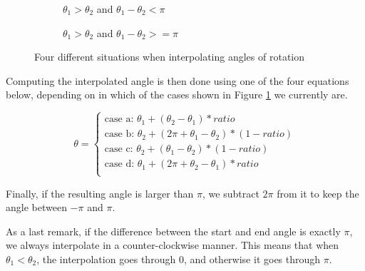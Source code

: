 \begin{figure}[h!]
\begin{subfigure}[b]{0.475\textwidth}
    \caption{$\theta_1 > \theta_2$ and $\theta_1 - \theta_2 < \pi$}
\end{subfigure}
\hfill
\begin{subfigure}[b]{0.475\textwidth}
    \centering
    \caption{$\theta_1 > \theta_2$ and $\theta_1 - \theta_2 >= \pi$}
\end{subfigure}
\caption{Four different situations when interpolating angles of rotation}
\label{fig:interpolation_situations}
\end{figure}

Computing the interpolated angle is then done using one of the four equations below, depending on in which of the cases shown in Figure \ref{fig:interpolation_situations} we currently are.

\[
    \theta = 
    \begin{cases}
        \text{case a: } \theta_1 + (\theta_2 - \theta_1)*ratio \\
        \text{case b: } \theta_2 + (2\pi + \theta_1 - \theta_2)*(1 - ratio) \\
        \text{case c: } \theta_2 + (\theta_1 - \theta_2)*(1 - ratio) \\
        \text{case d: } \theta_1 + (2\pi + \theta_2 - \theta_1)*ratio \\
    \end{cases}
\]

Finally, if the resulting angle is larger than $\pi$, we subtract $2\pi$ from it to keep the angle between $-\pi$ and $\pi$.

As a last remark, if the difference between the start and end angle is exactly $\pi$, we always interpolate in a counter-clockwise manner. This means that when $\theta_1 < \theta_2$, the interpolation goes through $0$, and otherwise it goes through $\pi$.

